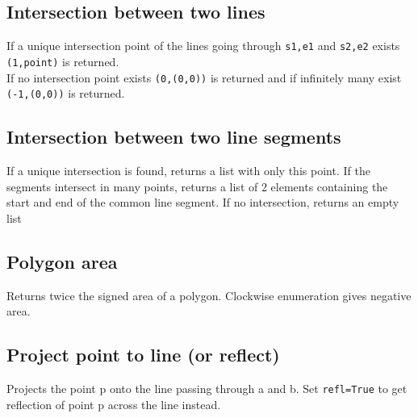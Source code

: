 \documentclass{article}
\begin{document}
\subsection*{Intersection between two lines}
If a unique intersection point of the lines going through \lstinline{s1,e1} and \lstinline{s2,e2} exists \lstinline{(1,point)} is returned.\\
If no intersection point exists \lstinline{(0,(0,0))} is returned and if infinitely many exist \lstinline{(-1,(0,0))} is returned.
\begin{multicols}{2}
  
  \columnbreak
  
\end{multicols}

\subsection*{Intersection between two line segments}
If a unique intersection is found, returns a list with only this point.
If the segments intersect in many points, returns a list of 2 elements containing the
start and end of the common line segment. If no intersection, returns an empty list

\begin{multicols}{2}
  
  \columnbreak
  
\end{multicols}

\subsection*{Polygon area}
Returns twice the signed area of a polygon. Clockwise enumeration gives negative area.
\begin{multicols}{2}
  
  \columnbreak
  
\end{multicols}

\subsection*{Project point to line (or reflect)}
Projects the point p onto the line passing through a and b.
Set \lstinline{refl=True} to get reflection of point p across the line instead.
\begin{multicols}{2}
  
  \columnbreak
  
\end{multicols}
\end{document}
